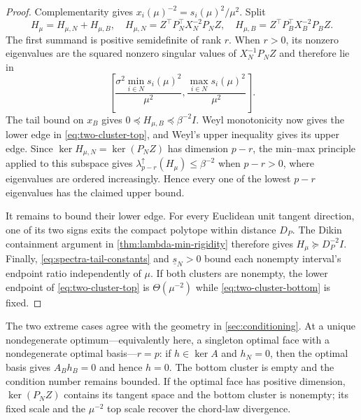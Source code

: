 \begin{proof}
Complementarity gives $x_i(\mu)^{-2}=s_i(\mu)^2/\mu^2$.  Split
\begin{equation}
 H_\mu=H_{\mu,N}+H_{\mu,B},
 \quad
 H_{\mu,N}=Z^\top P_N^\top X_N^{-2}P_NZ,
 \quad
 H_{\mu,B}=Z^\top P_B^\top X_B^{-2}P_BZ.
 \label{eq:two-cluster-split}
\end{equation}
The first summand is positive semidefinite of rank $r$.  When $r>0$, its nonzero
eigenvalues are the squared nonzero singular values of $X_N^{-1}P_NZ$ and
therefore lie in
\[
 \left[
  \frac{\sigma^2\min_{i\in N}s_i(\mu)^2}{\mu^2},
  \frac{\max_{i\in N}s_i(\mu)^2}{\mu^2}
 \right].
\]
The tail bound on $x_B$ gives
$0\preceq H_{\mu,B}\preceq\beta^{-2}I$.
Weyl monotonicity now gives the lower edge in
\eqref{eq:two-cluster-top}, and Weyl's upper inequality gives its upper
edge.  Since $\ker H_{\mu,N}=\ker(P_NZ)$ has dimension $p-r$, the min--max
principle applied to this subspace gives
$\lambda_{p-r}^{\uparrow}(H_\mu)\leq\beta^{-2}$ when $p-r>0$, where
eigenvalues are ordered increasingly.  Hence every one of the lowest $p-r$
eigenvalues has the claimed upper bound.

It remains to bound their lower edge.  For every Euclidean unit tangent
direction, one of its two signs exits the compact polytope within distance
$D_P$.  The Dikin containment argument in
\cref{thm:lambda-min-rigidity} therefore gives
$H_\mu\succeq D_P^{-2}I$.  Finally,
\eqref{eq:spectra-tail-constants} and $\underline s_N>0$ bound each
nonempty interval's endpoint ratio independently of $\mu$.  If both clusters
are nonempty, the lower endpoint of \eqref{eq:two-cluster-top} is
$\Theta(\mu^{-2})$ while \eqref{eq:two-cluster-bottom} is fixed.
\end{proof}

The two extreme cases agree with the geometry in \cref{sec:conditioning}.  At a
unique nondegenerate optimum---equivalently here, a singleton optimal face
with a nondegenerate optimal basis---$r=p$: if $h\in\ker A$ and $h_N=0$,
then the optimal basis gives $A_Bh_B=0$ and hence $h=0$.  The bottom cluster
is empty and the condition number remains bounded.  If the optimal face has positive
dimension, $\ker(P_NZ)$ contains its tangent space and the bottom cluster is
nonempty; its fixed scale and the $\mu^{-2}$ top scale recover the chord-law
divergence.

